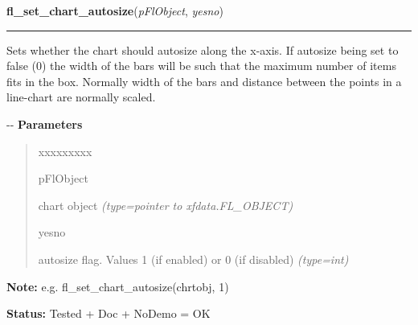\hspace{.8\funcindent}\begin{boxedminipage}{\funcwidth}

    \raggedright \textbf{fl\_set\_chart\_autosize}(\textit{pFlObject}, \textit{yesno})

    \vspace{-1.5ex}

    \rule{\textwidth}{0.5\fboxrule}
\setlength{\parskip}{2ex}

Sets whether the chart should autosize along the x-axis. If autosize
being set to false (0) the width of the bars will be such that the maximum
number of items fits in the box. Normally width of the bars and distance
between the points in a line-chart are normally scaled.

-{}-
\setlength{\parskip}{1ex}
      \textbf{Parameters}
      \vspace{-1ex}

      \begin{quote}
        \begin{Ventry}{xxxxxxxxx}

          \item[pFlObject]


chart object
            {\it (type=pointer to xfdata.FL\_OBJECT)}

          \item[yesno]


autosize flag. Values 1 (if enabled) or 0 (if disabled)
            {\it (type=int)}

        \end{Ventry}

      \end{quote}

\textbf{Note:} 
e.g. fl\_set\_chart\_autosize(chrtobj, 1)


\textbf{Status:} 
Tested + Doc + NoDemo = OK


    \end{boxedminipage}

    \label{xformslib:flchart:fl_set_chart_lstyle}

    \vspace{0.5ex}

